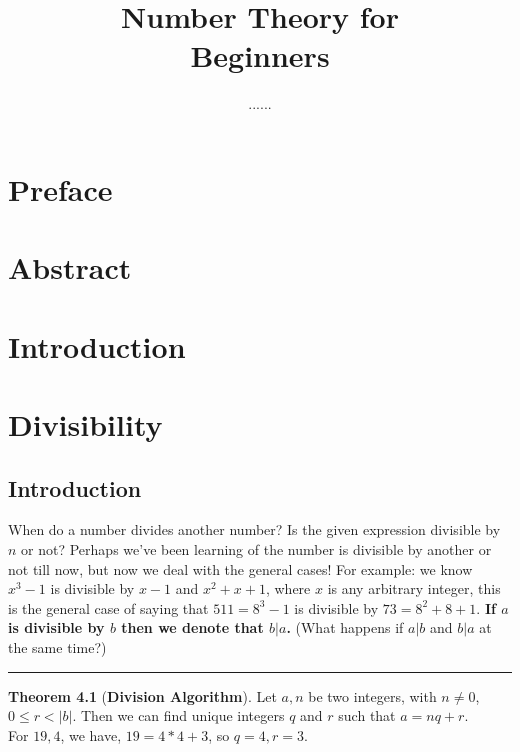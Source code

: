 \documentclass[a4paper,oneside,12 pt]{book}
\theoremstyle{definition}
\theoremstyle{definition}
\theoremstyle{definition}
\newtheorem{theorem}{Theorem} [section]
\begin{document}
\frontmatter
\title{\bfseries {\textcolor{title}{Number Theory for \\ Beginners}}}
\author{\textcolor{other}{......}} 
\date{}
\maketitle

\tableofcontents 


\chapter{Preface}


\chapter{Abstract}
\chapter{Introduction}


\mainmatter


\chapter{Divisibility }
\section{Introduction}
When do a number divides another number? Is the given expression divisible by $n$ or not? Perhaps we've been learning of the number is divisible by another or not till now, but now we deal with the general cases! For example: we know $x^3-1$ is divisible by $x-1$ and $x^2+x+1$, where $x$ is any arbitrary integer, this is the general case of saying that $511=8^3-1$ is divisible by $73=8^2+8+1$. \textbf{If $a$ is divisible by $b$ then we denote that $b|a$.} (What happens if $a|b$ and $b|a$ at the same time?)\\
\rule{\textwidth}{1pt}

\begin{theorem}[\textbf{Division Algorithm}] 
Let $a,n$ be two integers, with $n\neq 0$, $0\leq r<|b|$. Then we can find unique integers $q$ and $r$ such that $a=nq+r$. \\
\textsf{For $19,4$, we have, $19=4*4+3$, so $q=4,r=3.$}
\end{theorem}
\end{document}
